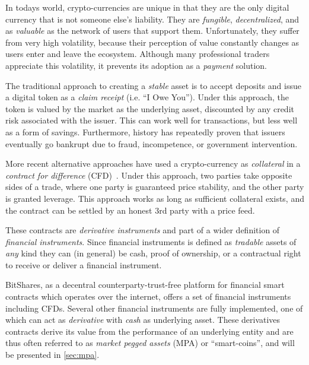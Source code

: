 In todays world, crypto-currencies are unique in that they are the only digital
currency that is not someone else's liability. They are \emph{fungible},
\emph{decentralized}, and as \emph{valuable} as the network of users that
support them. Unfortunately, they suffer from very high volatility, because
their perception of value constantly changes as users enter and leave the
ecosystem. Although many professional traders appreciate this volatility, it
prevents its adoption as a \emph{payment} solution.

The traditional approach to creating a \emph{stable} asset is to accept
deposits and issue a digital token as a \emph{claim receipt} (i.e. ``I Owe
You''). Under this approach, the token is valued by the market as the
underlying asset, discounted by any credit risk associated with the issuer.
This can work well for transactions, but less well as a form of savings.
Furthermore, history has repeatedly proven that issuers eventually go bankrupt
due to fraud, incompetence, or government intervention.

More recent alternative approaches have used a crypto-currency as
\emph{collateral} in a \emph{contract for difference} (CFD)~\cite{def:cfd}.
Under this approach, two parties take opposite sides of a trade, where one
party is guaranteed price stability, and the other party is granted leverage.
This approach works as long as sufficient collateral exists, and the contract
can be settled by an honest 3rd party with a price feed.

These contracts are \emph{derivative instruments} and part of a wider
definition of \emph{financial instruments}. Since financial instruments is
defined as \emph{tradable} assets of \emph{any} kind they can (in general) be
cash, proof of ownership, or a contractual right to receive or deliver a
financial instrument. 

BitShares, as a decentral counterparty-trust-free platform for financial smart
contracts which operates over the internet, offers a set of financial
instruments including CFDs. Several other financial instruments are fully
implemented, one of which can act as \emph{derivative} with \emph{cash} as
underlying asset. These derivatives contracts derive its value from the
performance of an underlying entity and are thus often referred to as
\emph{market pegged assets} (MPA) or ``smart-coins'', and will be presented in
\cref{sec:mpa}.

